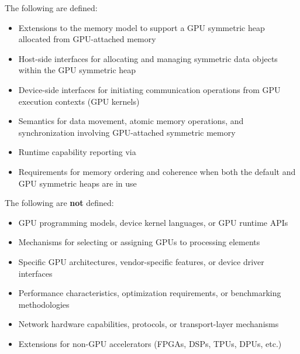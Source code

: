 
The following are defined:
\begin{itemize}
\item Extensions to the \openshmem memory model to support a \ac{GPU} symmetric
  heap allocated from GPU-attached memory
\item Host-side interfaces for allocating and managing symmetric data objects
  within the \ac{GPU} symmetric heap
\item Device-side interfaces for initiating communication operations from
  \ac{GPU} execution contexts (\ac{GPU} kernels)
\item Semantics for data movement, atomic memory operations, and synchronization
  involving GPU-attached symmetric memory
\item Runtime capability reporting via 
\item Requirements for memory ordering and coherence when both the default and
  \ac{GPU} symmetric heaps are in use
\end{itemize}

The following are \textbf{not} defined:
\begin{itemize}
\item GPU programming models, device kernel languages, or GPU runtime APIs
\item Mechanisms for selecting or assigning GPUs to processing elements
\item Specific GPU architectures, vendor-specific features, or device driver
  interfaces
\item Performance characteristics, optimization requirements, or benchmarking
  methodologies
\item Network hardware capabilities, protocols, or transport-layer mechanisms
\item Extensions for non-GPU accelerators (FPGAs, DSPs, TPUs, DPUs, etc.)
\end{itemize}

